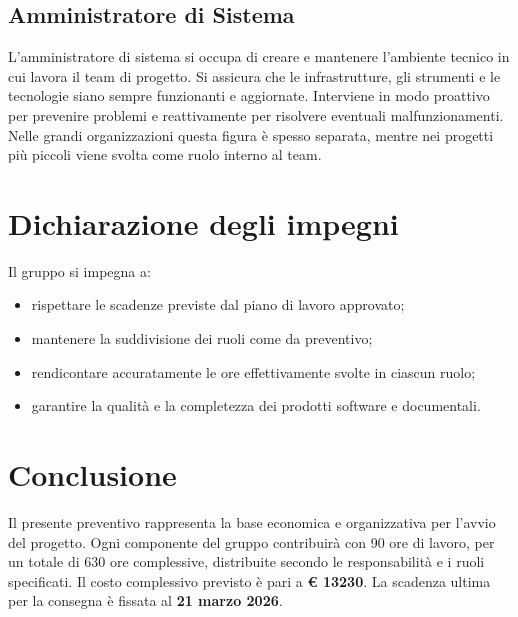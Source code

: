 \documentclass[a4paper, 11pt, oneside]{scrartcl} %
\begin{document}
\subsection{Amministratore di Sistema}

L’amministratore di sistema si occupa di creare e mantenere l’ambiente tecnico in cui lavora il team di progetto.  
Si assicura che le infrastrutture, gli strumenti e le tecnologie siano sempre funzionanti e aggiornate.  
Interviene in modo proattivo per prevenire problemi e reattivamente per risolvere eventuali malfunzionamenti.
Nelle grandi organizzazioni questa figura è spesso separata, mentre nei progetti più piccoli viene svolta come ruolo interno al team.

\section{Dichiarazione degli impegni}

Il gruppo si impegna a:
\begin{itemize}
    \item rispettare le scadenze previste dal piano di lavoro approvato;
    \item mantenere la suddivisione dei ruoli come da preventivo;
    \item rendicontare accuratamente le ore effettivamente svolte in ciascun ruolo;
    \item garantire la qualità e la completezza dei prodotti software e documentali.
\end{itemize}

\section{Conclusione}

Il presente preventivo rappresenta la base economica e organizzativa per l’avvio del progetto.  
Ogni componente del gruppo contribuirà con 90 ore di lavoro, per un totale di 630 ore complessive, distribuite secondo le responsabilità e i ruoli specificati.  
Il costo complessivo previsto è pari a \textbf{€ 13230}.  
La scadenza ultima per la consegna è fissata al \textbf{21 marzo 2026}.
\end{document}
